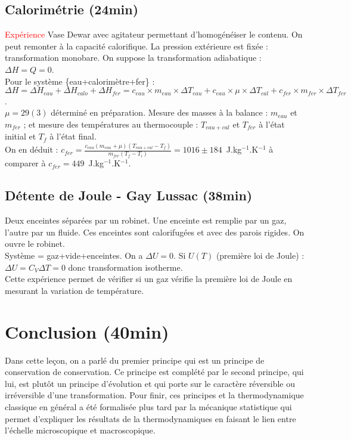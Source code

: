 \documentclass[11pt]{report}
\numberwithin{figure}{section}
\numberwithin{equation}{section}
\numberwithin{table}{section}
\newcommand{\1}{\boldsymbol{1}}
\begin{document}
\subsection{Calorimétrie (24min)}
  \textcolor{red}{Expérience} Vase Dewar avec agitateur permettant d'homogénéiser le contenu. On peut remonter à la capacité calorifique.  La pression extérieure est fixée : transformation monobare. On suppose la transformation adiabatique : $\Delta H = Q = 0$.\\
  Pour le système \{eau+calorimètre+fer\} : $\Delta H = \Delta H_{eau} + \Delta H_{calo} + \Delta H_{fer} = c_{eau}\times m_{eau}\times \Delta T_{eau} + c_{eau}\times \mu \times \Delta T_{cal} + c_{fer}\times m_{fer}\times \Delta T_{fer}$.\\
  $\mu =29(3)$ déterminé en préparation. Mesure des masses à la balance : $m_{eau}$ et $m_{fer}$ ; et mesure des températures au thermocouple : $T_{eau+cal}$ et $T_{fer}$ à l'état initial et  $T_f$ à l'état final.\\
  On en déduit : $c_{fer}=\frac{c_{eau}(m_{eau}+\mu)(T_{eau+cal}-T_f)}{m_{fer}(T_f-T_i)}=1016\pm 184$~J.kg$^{-1}$.K$^{-1}$ à comparer à $c_{fer}=449$~J.kg$^{-1}$.K$^{-1}$.\\
  
  \subsection{Détente de Joule - Gay Lussac (38min)}
  Deux enceintes séparées par un robinet. Une enceinte est remplie par un gaz, l'autre par un fluide. Ces enceintes sont calorifugées et avec des parois rigides. On ouvre le robinet. \\
  Système = {gaz+vide+enceintes}. On a $\Delta U=0$. Si $U(T)$ (première loi de Joule) : $\Delta U = C_{V}\Delta T = 0$ donc transformation isotherme. \\
  Cette expérience permet de vérifier si un gaz vérifie la première loi de Joule en mesurant la variation de température.
  
  \section*{Conclusion (40min)}

  Dans cette leçon, on a parlé du premier principe qui est un principe de conservation de conservation. Ce principe est complété par le second principe, qui lui, est plutôt un principe d'évolution et qui porte sur le caractère réversible ou irréversible d'une transformation. Pour finir, ces principes et la thermodynamique classique en général a été formalisée plus tard par la mécanique statistique qui permet d'expliquer les résultats de la thermodynamiques en faisant le lien entre l'échelle microscopique et macroscopique.
\end{document}
